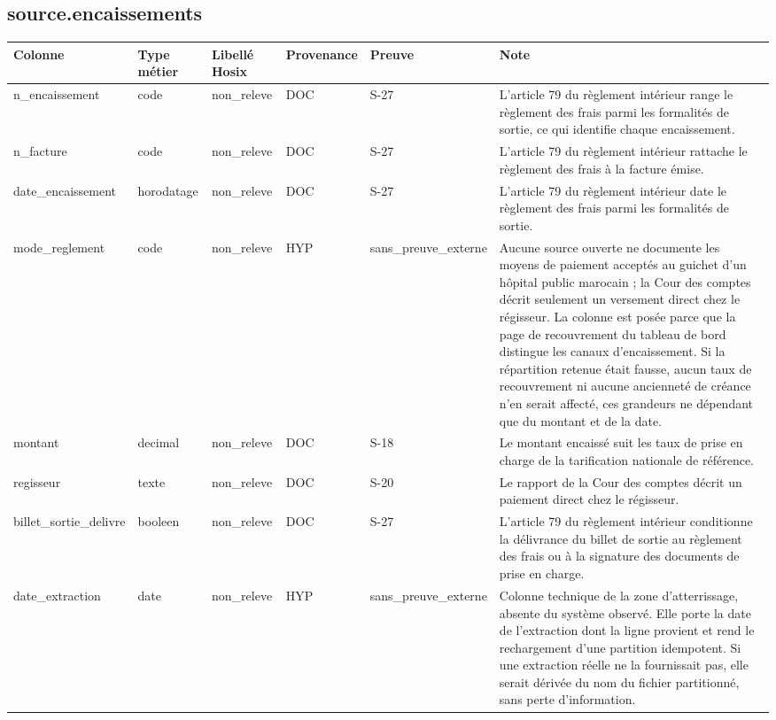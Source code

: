 \subsection*{source.encaissements}
\begin{longtable}{p{2.5cm}p{1.8cm}p{2.8cm}p{1.3cm}p{2.2cm}p{5cm}}
\hline
Colonne & Type métier & Libellé Hosix & Provenance & Preuve & Note \\
\hline
\endhead
n\_encaissement & code & non\_releve & DOC & S-27 & L'article 79 du règlement intérieur range le règlement des frais parmi les formalités de sortie, ce qui identifie chaque encaissement. \\
n\_facture & code & non\_releve & DOC & S-27 & L'article 79 du règlement intérieur rattache le règlement des frais à la facture émise. \\
date\_encaissement & horodatage & non\_releve & DOC & S-27 & L'article 79 du règlement intérieur date le règlement des frais parmi les formalités de sortie. \\
mode\_reglement & code & non\_releve & HYP & sans\_preuve\_externe & Aucune source ouverte ne documente les moyens de paiement acceptés au guichet d'un hôpital public marocain ; la Cour des comptes décrit seulement un versement direct chez le régisseur. La colonne est posée parce que la page de recouvrement du tableau de bord distingue les canaux d'encaissement. Si la répartition retenue était fausse, aucun taux de recouvrement ni aucune ancienneté de créance n'en serait affecté, ces grandeurs ne dépendant que du montant et de la date. \\
montant & decimal & non\_releve & DOC & S-18 & Le montant encaissé suit les taux de prise en charge de la tarification nationale de référence. \\
regisseur & texte & non\_releve & DOC & S-20 & Le rapport de la Cour des comptes décrit un paiement direct chez le régisseur. \\
billet\_sortie\_delivre & booleen & non\_releve & DOC & S-27 & L'article 79 du règlement intérieur conditionne la délivrance du billet de sortie au règlement des frais ou à la signature des documents de prise en charge. \\
date\_extraction & date & non\_releve & HYP & sans\_preuve\_externe & Colonne technique de la zone d'atterrissage, absente du système observé. Elle porte la date de l'extraction dont la ligne provient et rend le rechargement d'une partition idempotent. Si une extraction réelle ne la fournissait pas, elle serait dérivée du nom du fichier partitionné, sans perte d'information. \\
\hline
\end{longtable}

